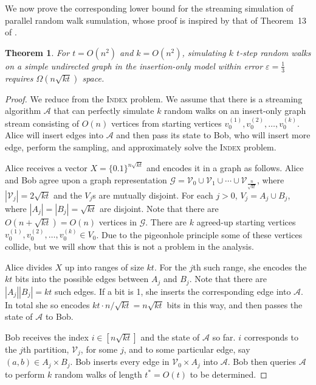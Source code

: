 \documentclass[10]{article}
\newtheorem{theorem}{Theorem}[section]
\newcommand{\algoname}[1]{\textnormal{\textsc{#1}}}
\begin{document}
We now prove the corresponding lower bound for the streaming simulation of parallel random walk sumulation, whose proof is inspired by that of Theorem~13 of \cite{jin2018simulating}.
%
\begin{theorem} \label{thm:rw:lower}
For $t = O(n^2)$ and $k = O(n^2)$, simulating $k$ $t$-step random walks on a simple undirected graph in the insertion-only model within error $\varepsilon = \frac{1}{3}$ requires $\Omega(n\sqrt{kt})$ space.
\end{theorem}
%
\begin{proof}
We reduce from the \algoname{Index} problem.
We assume that there is a streaming algorithm $\mathcal{A}$ that can perfectly simulate $k$ random walks on an insert-only graph stream
consisting of $O(n)$ vertices from starting vertices $v_0^{(1)}, v_0^{(2)}, \dots, v_0^{(k)}$.
Alice will insert edges into $\mathcal{A}$ and then pass its state to Bob, who will insert more edge, perform the sampling, and approximately solve the \algoname{Index} problem.

Alice receives a vector $X = \{0.1\}^{n\sqrt{kt}}$ and encodes it in a graph as follows.
Alice and Bob agree upon a graph representation $\mathcal{G} = \mathcal{V}_0 \cup \mathcal{V}_1 \cup \cdots \cup \mathcal{V}_{\frac{n}{\sqrt{kt}}}$, where $|\mathcal{V}_j| = 2 \sqrt{kt}$ and the $V_j$s are mutually disjoint.
For each $j >0$, $V_j = A_j \cup B_j$, where $|A_j| = |B_j| = \sqrt{kt}$ are disjoint.
Note that there are $O(n + \sqrt{kt}) = O(n)$ vertices in $\mathcal{G}$.
There are $k$ agreed-up starting vertices $v_0^{(1)}, v_0^{(2)}, \dots, v_0^{(k)} \in V_0$.
Due to the pigeonhole principle some of these vertices collide, but we will show that this is not a problem in the analysis.

Alice divides $X$ up into ranges of size $kt$.
For the $j$th such range, she encodes the $kt$ bits into the possible edges between $A_j$ and $B_j$.
Note that there are $|A_j||B_j| = kt$ such edges.
If a bit is 1, she inserts the corresponding edge into $\mathcal{A}$. 
In total she so encodes $kt \cdot n/\sqrt{kt} = n\sqrt{kt}$ bits in this way, and then passes the state of $\mathcal{A}$ to Bob. 

Bob receives the index $i \in [n\sqrt{kt}]$ and the state of $\mathcal{A}$ so far.
$i$ corresponds to the $j$th partition, $\mathcal{V}_j$, for some $j$, and to some particular edge, say $(a,b) \in A_j \times B_j$.
Bob inserts every edge in $\mathcal{V}_0 \times A_j$ into $\mathcal{A}$.
Bob then queries $\mathcal{A}$ to perform $k$ random walks of length $t^* = O(t)$ to be determined.


\end{proof}
\end{document}
